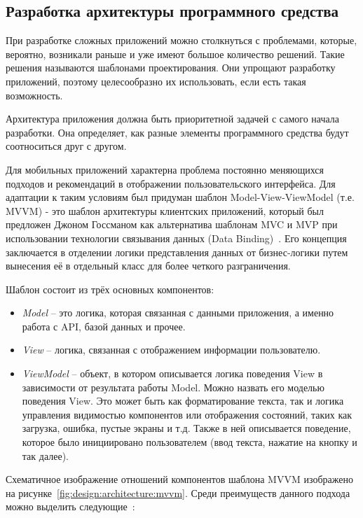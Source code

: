 \subsection{Разработка архитектуры программного средства}
\label{sec:design:architecture}

При разработке сложных приложений можно столкнуться с проблемами, которые, вероятно, возникали раньше и уже имеют большое количество решений.
Такие решения называются шаблонами проектирования.
Они упрощают разработку приложений, поэтому целесообразно их использовать, если есть такая возможность.

Архитектура приложения должна быть приоритетной задачей с самого начала разработки.
Она определяет, как разные элементы программного средства будут соотноситься друг с другом.

Для мобильных приложений характерна проблема постоянно меняющихся подходов и рекомендаций в отображении пользовательского интерфейса.
Для адаптации к таким условиям был придуман шаблон Model-View-ViewModel (т.е. MVVM) - это шаблон архитектуры клиентских приложений, который был предложен Джоном Госсманом как альтернатива шаблонам MVC и MVP при использовании технологии связывания данных (Data Binding)~\cite{microsoft_mvvm}.
Его концепция заключается в отделении логики представления данных от бизнес-логики путем вынесения её в отдельный класс для более четкого разграничения.

Шаблон состоит из трёх основных компонентов:
\begin{itemize}
    \item \emph{Model} -- это логика, которая связанная с данными приложения, а именно работа с API, базой данных и прочее.
    \item \emph{View} -- логика, связанная с отображением информации пользователю.
    \item \emph{ViewModel} -- объект, в котором описывается логика поведения View в зависимости от результата работы Model. Можно назвать его моделью поведения View. Это может быть как форматирование текста, так и логика управления видимостью компонентов или отображения состояний, таких как загрузка, ошибка, пустые экраны и т.д. Также в ней описывается поведение, которое было инициировано пользователем (ввод текста, нажатие на кнопку и так далее).
\end{itemize}

Схематичное изображение отношений компонентов шаблона MVVM изображено на рисунке~\ref{fig:design:architecture:mvvm}.
Среди преимуществ данного подхода можно выделить следующие~\cite{android_mvvm}:


